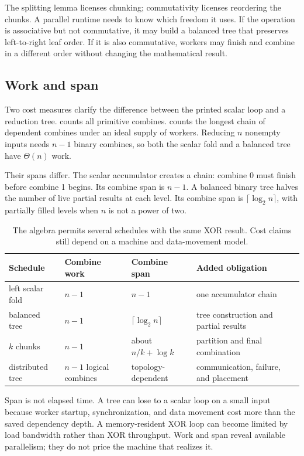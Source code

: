 The splitting lemma licenses chunking; commutativity licenses reordering the
chunks. A parallel runtime needs to know which freedom it uses. If the
operation is associative but not commutative, it may build a balanced tree
that preserves left-to-right leaf order. If it is also commutative, workers
may finish and combine in a different order without changing the mathematical
result.

\subsection{Work and span}

Two cost measures clarify the difference between the printed scalar loop and
a reduction tree.  counts all primitive combines. 
counts the longest chain of dependent combines under an ideal supply of
workers. Reducing \(n\) nonempty inputs needs \(n-1\) binary combines, so both
the scalar fold and a balanced tree have \(\Theta(n)\) work.

Their spans differ. The scalar accumulator creates a chain: combine 0 must
finish before combine 1 begins. Its combine span is \(n-1\). A balanced binary
tree halves the number of live partial results at each level. Its combine span
is \(\lceil\log_2 n\rceil\), with partially filled levels when \(n\) is not a
power of two.

\begin{table}[htbp]
\centering
\caption{The algebra permits several schedules with the same XOR result. Cost
claims still depend on a machine and data-movement model.}
\begin{tabular}{@{}p{}p{}p{}p{}@{}}
\toprule
Schedule & Combine work & Combine span & Added obligation \\
\midrule
left scalar fold & \(n-1\) & \(n-1\) & one accumulator chain \\
balanced tree & \(n-1\) & \(\lceil\log_2 n\rceil\) & tree construction and partial results \\
\(k\) chunks & \(n-1\) & about \(n/k+\log k\) & partition and final combination \\
distributed tree & \(n-1\) logical combines & topology-dependent & communication, failure, and placement \\
\bottomrule
\end{tabular}
\label{tab:xor-work-span}
\end{table}

Span is not elapsed time. A tree can lose to a scalar loop on a small input
because worker startup, synchronization, and data movement cost more than the
saved dependency depth. A memory-resident XOR loop can become limited by load
bandwidth rather than XOR throughput. Work and span reveal available
parallelism; they do not price the machine that realizes it.

